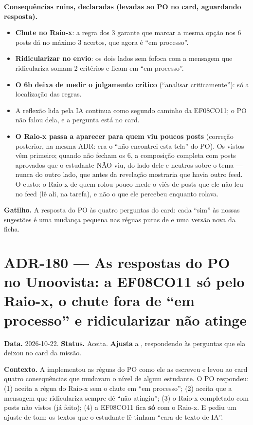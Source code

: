 \textbf{Consequências ruins, declaradas (levadas ao PO no card, aguardando
resposta).}

\begin{itemize}
  \item \textbf{Chute no Raio-x}: a regra dos 3 garante que marcar a mesma opção
    nos 6 posts dá no máximo 3 acertos, que agora é \enquote{em processo}.
  \item \textbf{Ridicularizar no envio}: os dois lados sem fofoca com a mensagem
    que ridiculariza somam 2 critérios e ficam em \enquote{em processo}.
  \item \textbf{O 6b deixa de medir o julgamento crítico} (\enquote{analisar
    criticamente}): só a localização das regras.
  \item A reflexão lida pela IA continua como segundo caminho da EF08CO11; o
    PO não falou dela, e a pergunta está no card.
  \item \textbf{O Raio-x passa a aparecer para quem viu poucos posts}
    (correção posterior, na mesma ADR: era o \enquote{não encontrei esta
    tela} do PO). Os vistos vêm primeiro; quando não fecham os 6, a
    composição completa com posts aprovados que o estudante NÃO viu, do lado
    dele e neutros sobre o tema --- nunca do outro lado, que antes da
    revelação mostraria que havia outro feed. O custo: o Raio-x de quem
    rolou pouco mede o viés de posts que ele não leu no feed (lê ali, na
    tarefa), e não o que ele percebeu enquanto rolava.
\end{itemize}

\textbf{Gatilho.} A resposta do PO às quatro perguntas do card: cada \enquote{sim}
às nossas sugestões é uma mudança pequena nas réguas puras de
 e uma versão nova da ficha.

\section{ADR-180 --- As respostas do PO no Unoovista: a EF08CO11 só pelo Raio-x, o chute fora de \enquote{em processo} e ridicularizar não atinge}
\label{adr:exp08ef1b-respostas-do-po}

\textbf{Data.} 2026-10-22. \textbf{Status.} Aceita. \textbf{Ajusta} a
, respondendo às perguntas que ela deixou no card da missão.

\textbf{Contexto.} A  implementou as réguas do PO como ele as
escreveu e levou ao card quatro consequências que mudavam o nível de algum
estudante. O PO respondeu: (1) aceita a régua do Raio-x sem o chute em
\enquote{em processo}; (2) aceita que a mensagem que ridiculariza sempre dê
\enquote{não atingiu}; (3) o Raio-x completado com posts não vistos (já
feito); (4) a EF08CO11 fica \textbf{só} com o Raio-x. E pediu um ajuste de
tom: os textos que o estudante lê tinham \enquote{cara de texto de IA}.


